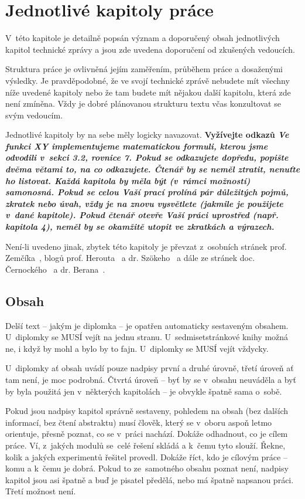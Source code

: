 \chapter{Jednotlivé kapitoly práce}
\label{kapitoly}

V~této kapitole je detailně popsán význam a doporučený obsah jednotlivých kapitol technické zprávy a jsou zde uvedena doporučení od zkušených vedoucích. 

Struktura práce je ovlivněná jejím zaměřením, průběhem práce a dosaženými výsledky. Je pravděpodobné, že ve svojí technické zprávě nebudete mít všechny níže uvedené kapitoly nebo že tam budete mít nějakou další kapitolu, která zde není zmíněna. Vždy je dobré plánovanou strukturu textu včas konzultovat se svým vedoucím.

Jednotlivé kapitoly by na sebe měly logicky navazovat. \bf Vyžívejte odkazů \rm \it Ve funkci XY implementujeme matematickou formuli, kterou jsme odvodili v~sekci 3.2, rovnice 7. \rm Pokud se odkazujete dopředu, popište dvěma větami to, na co odkazujete. Čtenář by se neměl ztratit, nenuťte ho listovat. \bf Každá kapitola by měla být (v~rámci možností) samonosná. \rm Pokud se celou Vaší prací prolíná pár důležitých pojmů, zkratek nebo úvah, vždy je na znovu vysvětlete (jakmile je použijete v~dané kapitole). Pokud čtenář otevře Vaší práci uprostřed (např. kapitola 4), neměl by se okamžitě utopit ve zkratkách a výrazech.~\cite{rady}

Není-li uvedeno jinak, zbytek této kapitoly je převzat z~osobních stránek prof. Zemčíka~\cite{Zemcik}, blogů prof. Herouta~\cite{Herout} a dr. Szökeho~\cite{rady} a dále ze stránek doc. Černockého~\cite{Cernocky} a dr. Berana~\cite{Beran}.

\section{Obsah}
\label{obsah}

Delší text -- jakým je diplomka -- je opatřen automaticky sestaveným obsahem. U~diplomky se MUSÍ vejít na jednu stranu. U~sedmisetstránkové knihy možná ne, i když by mohl a bylo by to fajn. U~diplomky se MUSÍ vejít vždycky.

U~diplomky ať obsah uvádí pouze nadpisy první a druhé úrovně, třetí úroveň ať tam není, je moc podrobná. Čtvrtá úroveň -- byť by se v~obsahu neuváděla a byť by byla použitá jen v~některých kapitolách -- je obvykle špatně sama o~sobě.

Pokud jsou nadpisy kapitol správně sestaveny, pohledem na obsah (bez dalších informací, bez čtení abstraktu) musí člověk, který se v~oboru aspoň letmo orientuje, přesně poznat, co se v~práci nachází. Dokáže odhadnout, co je cílem práce. Ví, z~jakých modulů se~celé řešení skládá a k~čemu tyto slouží. Řekne, kolik a jakých experimentů řešitel provedl. Dokáže říct, kdo je cílovým  práce -- komu a k~čemu je dobrá. Pokud to ze~samotného obsahu poznat není, nadpisy kapitol jsou asi špatně a buď je pisatel předělá, nebo má špatně napsanou práci. Třetí možnost není.

